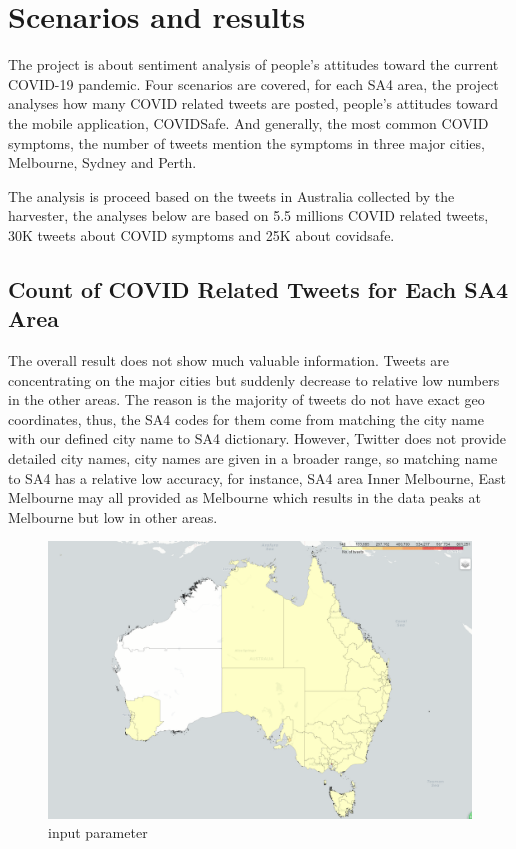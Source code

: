 \section{Scenarios and results}
The project is about sentiment analysis of people's attitudes toward the current COVID-19 pandemic. Four scenarios are covered, for each SA4 area, the project analyses how many COVID related tweets are posted, people's attitudes toward the mobile application, COVIDSafe. And generally, the most common COVID symptoms, the number of tweets mention the symptoms in three major cities, Melbourne, Sydney and Perth.

The analysis is proceed based on the tweets in Australia collected by the harvester, the analyses below are based on 5.5 millions COVID related tweets, 30K tweets about COVID symptoms and 25K about covidsafe.

\subsection{Count of COVID Related Tweets for Each SA4 Area}

The overall result does not show much valuable information. Tweets are concentrating on the major cities but suddenly decrease to relative low numbers in the other areas. The reason is the majority of tweets do not have exact geo coordinates, thus, the SA4 codes for them come from matching the city name with our defined city name to SA4 dictionary. However, Twitter does not provide detailed city names, city names are given in a broader range, so matching name to SA4 has a relative low accuracy, for instance, SA4 area Inner Melbourne, East Melbourne may all provided as Melbourne which results in the data peaks at Melbourne but low in other areas.

\begin{figure}[H]
\centering
\includegraphics[scale=0.35]{city_analytics/report/images/covidtweet.png}
\caption{input parameter}
\label{fig:input parameter}
\end{figure}


